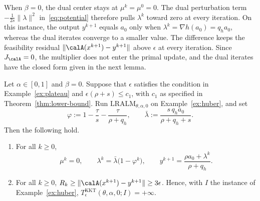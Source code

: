 When \(\beta=0\), the dual center stays at \(\mu^k=\mu^0=0\). The dual
perturbation term \(-\frac{1}{2s}\|\lambda\|^2\) in~\eqref{eq:potential}
therefore pulls \(\lambda^k\) toward zero at every iteration. On this
instance, the output \(y^{k+1}\) equals \(a_0\) only when
\(\lambda^k=\nabla h(a_0)=q_ha_0\), whereas the dual iterates converge to a
smaller value. The difference keeps the feasibility residual
\(\|\calA(x^{k+1})-y^{k+1}\|\) above \(\epsilon\) at every iteration. Since
\(J_{\calA}=0\), the multiplier does not enter the primal update, and the
dual iterates have the closed form given in the next lemma.

\begin{lemma}
\label{lem:huber}
Let \(\alpha\in[0,1]\) and \(\beta=0\). Suppose that \(\epsilon\) satisfies
the condition in Example~\ref{ex:plateau} and \(\epsilon(\rho+s)\le c_1\),
with \(c_1\) as specified in Theorem~\ref{thm:lower-bound}. Run
\(\mathrm{LRALM}_{\theta,\alpha,0}\) on Example~\ref{ex:huber}, and set
\[
\varphi:=1-\frac{\tau}{s}-\frac{\tau}{\rho+q_h},
\qquad
\bar\lambda:=\frac{s\,q_ha_0}{\rho+q_h+s}.
\]
Then the following hold.
\begin{enumerate}[label=(\roman*)]
\item For all \(k\ge0\),
  \[
  \mu^k=0,\qquad
  \lambda^k=\bar\lambda\bigl(1-\varphi^k\bigr),\qquad
  y^{k+1}=\frac{\rho a_0+\lambda^k}{\rho+q_h}.
  \]
\item For all \(k\ge0\),
  \(R_k\ge\|\calA(x^{k+1})-y^{k+1}\|\ge3\epsilon\). Hence, with \(I\) the
  instance of Example~\ref{ex:huber},
  \(T^{\mathrm{KKT}}_\epsilon(\theta,\alpha,0;I)=+\infty\).
\end{enumerate}
\end{lemma}

